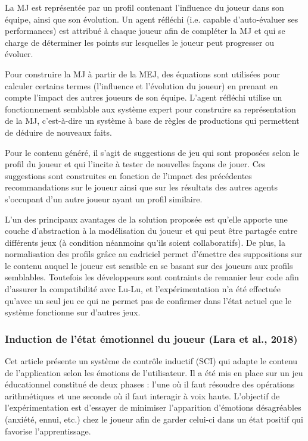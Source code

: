\documentclass[a4paper,11pt]{article}
\begin{document}
        La MJ est représentée par un profil contenant l'influence du joueur dans son équipe, ainsi que son évolution.
        Un agent réfléchi (i.e. capable d'auto-évaluer ses performances) est attribué à chaque joueur afin de compléter la MJ et qui se charge de déterminer les points sur lesquelles le joueur peut progresser ou évoluer.
        
        Pour construire la MJ à partir de la MEJ, des équations sont utilisées pour calculer certains termes (l'influence et l'évolution du joueur) en prenant en compte l'impact des autres joueurs de son équipe.
        L'agent réfléchi utilise un fonctionnement semblable aux système expert pour construire sa représentation de la MJ, c'est-à-dire un système à base de règles de productions qui permettent de déduire de nouveaux faits.
      
        Pour le contenu généré, il s'agit de suggestions de jeu qui sont proposées selon le profil du joueur et qui l'incite à tester de nouvelles façons de jouer.
        Ces suggestions sont construites en fonction de l'impact des précédentes recommandations sur le joueur ainsi que sur les résultats des autres agents s'occupant d'un autre joueur ayant un profil similaire.
      
        L'un des principaux avantages de la solution proposée est qu'elle apporte une couche d'abstraction à la modélisation du joueur et qui peut être partagée entre différents jeux (à condition néanmoins qu'ils soient collaboratifs).
        De plus, la normalisation des profils grâce au cadriciel permet d'émettre des suppositions sur le contenu auquel le joueur est sensible en se basant sur des joueurs aux profils semblables.
        Toutefois les développeurs sont contraints de remanier leur code afin d'assurer la compatibilité avec Lu-Lu, et l'expérimentation n'a été effectuée qu'avec un seul jeu ce qui ne permet pas de confirmer dans l'état actuel que le système fonctionne sur d'autres jeux.
        
      \subsubsection{Induction de l'état émotionnel du joueur (Lara et al., 2018)}\label{section:review-lara}

        Cet article présente un système de contrôle inductif (SCI) qui adapte le contenu de l'application selon les émotions de l'utilisateur.
        Il a été mis en place sur un jeu éducationnel constitué de deux phases : l'une où il faut résoudre des opérations arithmétiques et une seconde où il faut interagir à voix haute. 
        L'objectif de l'expérimentation est d'essayer de minimiser l'apparition d'émotions désagréables (anxiété, ennui, etc.) chez le joueur afin de garder celui-ci dans un état positif qui favorise l'apprentissage.
       
\end{document}
